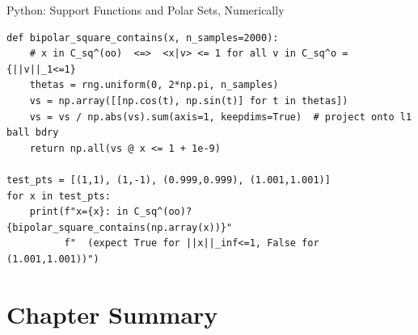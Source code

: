 \documentclass[aspectratio=169,10pt]{beamer}
\begin{document}
\begin{frame}[fragile]{Python: Support Functions and Polar Sets, Numerically}
\begin{lstlisting}[style=pycode]
def bipolar_square_contains(x, n_samples=2000):
    # x in C_sq^(oo)  <=>  <x|v> <= 1 for all v in C_sq^o = {||v||_1<=1}
    thetas = rng.uniform(0, 2*np.pi, n_samples)
    vs = np.array([[np.cos(t), np.sin(t)] for t in thetas])
    vs = vs / np.abs(vs).sum(axis=1, keepdims=True)  # project onto l1 ball bdry
    return np.all(vs @ x <= 1 + 1e-9)

test_pts = [(1,1), (1,-1), (0.999,0.999), (1.001,1.001)]
for x in test_pts:
    print(f"x={x}: in C_sq^(oo)? {bipolar_square_contains(np.array(x))}"
          f"  (expect True for ||x||_inf<=1, False for (1.001,1.001))")
\end{lstlisting}

\end{frame}

\section{Chapter Summary}
\end{document}
